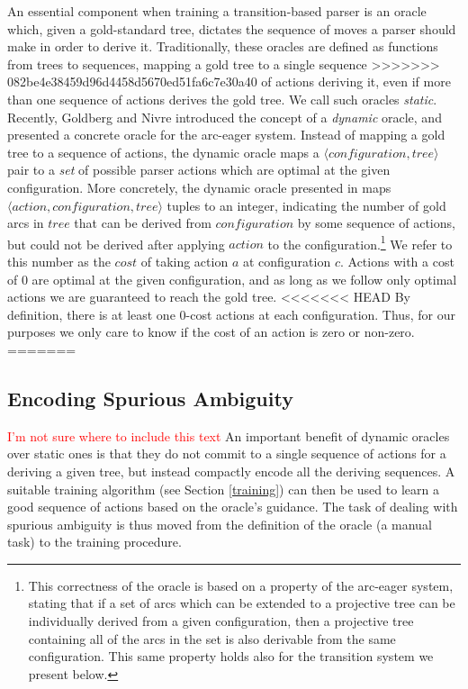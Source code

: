 \documentclass[11pt,letterpaper]{article}
\newcommand{\tuple}[1]{$\langle#1\rangle$}
\newcommand{\note}[1]{\textcolor{red}{#1}}
\begin{document}
An essential component when training a transition-based parser is an oracle
which, given a gold-standard tree, dictates the sequence of moves a parser
should make in order to derive it.  Traditionally, these oracles are defined
as functions from trees to sequences, mapping a gold tree to a single sequence
>>>>>>> 082be4e38459d96d4458d5670ed51fa6c7e30a40
of actions deriving it, even if more than one sequence of actions derives the
gold tree. We call such oracles \emph{static}.  Recently, Goldberg and Nivre
 introduced the concept of a \emph{dynamic} oracle, and
presented a concrete oracle for the arc-eager system.  Instead of mapping a
gold tree to a sequence of actions, the dynamic oracle maps a
\tuple{configuration, tree} pair to a \emph{set} of possible parser actions
which are optimal at the given configuration.  More concretely, the dynamic
oracle presented in \cite{coling2012} maps \tuple{action,configuration,tree}
tuples to an integer, indicating the number of gold arcs in $tree$ that can be
derived from $configuration$ by some sequence of actions, but could not be derived
after applying $action$ to the configuration.\footnote{This correctness of
the oracle is based on a property of the arc-eager system, stating that if a
set of arcs which can be extended to a projective tree can be individually
derived from a given configuration, then a projective tree containing all of
the arcs in the set is also derivable from the same configuration.  This same
property holds also for the transition system we present below.} We refer to
this number as the $cost$ of taking action $a$ at configuration $c$. Actions
with a cost of 0 are optimal at the given configuration, and as long as we
follow only optimal actions we are guaranteed to reach the gold tree.
<<<<<<< HEAD
By definition, there is at least one 0-cost actions at each configuration.
Thus, for our purposes we only care to know if the cost of an action is zero
or non-zero. 
=======
\subsection{Encoding Spurious Ambiguity}
\note{I'm not sure where to include this text}
An important benefit of dynamic oracles over static ones is that they do not
commit to a single sequence of actions for a deriving a given tree, but instead
compactly encode all the deriving sequences. A suitable training algorithm
(see Section \ref{training}) can then be used to learn a good sequence of
actions based on the oracle's guidance.  The task of dealing with spurious
ambiguity is thus moved from the definition of the oracle (a manual task) to
the training procedure.
\end{document}
